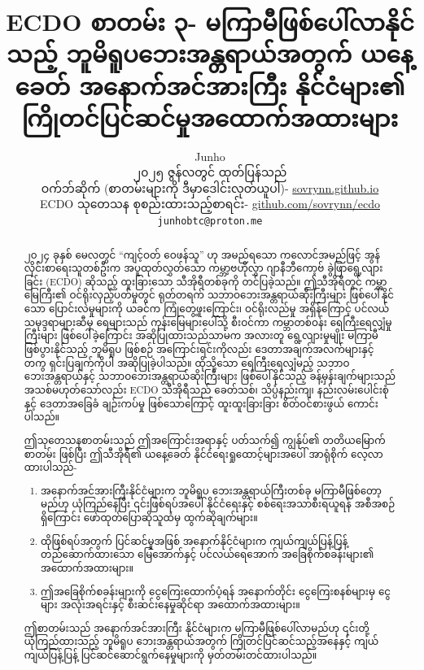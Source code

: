 \documentclass[10pt,twocolumn,letterpaper]{article}
\begin{document}
\title{ECDO စာတမ်း ၃- မကြာမီဖြစ်ပေါ်လာနိုင်သည့် ဘူမိရူပဘေးအန္တရာယ်အတွက် ယနေ့ခေတ် အနောက်အင်အားကြီး နိုင်ငံများ၏ ကြိုတင်ပြင်ဆင်မှုအထောက်အထားများ}

\author{Junho\\
၂၀၂၅ ဇွန်လတွင် ထုတ်ပြန်သည်\\
ဝက်ဘ်ဆိုက် (စာတမ်းများကို ဒီမှာဒေါင်းလုတ်ယူပါ)- \href{https://sovrynn.github.io}{sovrynn.github.io}\\
ECDO သုတေသန စုစည်းထားသည့်စာရင်း- \href{https://github.com/sovrynn/ecdo}{github.com/sovrynn/ecdo}\\
{\tt\small junhobtc@proton.me}
}
\maketitle

\begin{abstract}
၂၀၂၄ ခုနှစ် မေလတွင် “ကျင့်ဝတ် ဝေဖန်သူ” \cite{0} ဟု အမည်ရသော ကလောင်အမည်ဖြင့် အွန်လိုင်းစာရေးသူတစ်ဦးက အပူထုတ်လွှတ်သော ကမ္ဘာ့ဗဟိုလွှာ ဂျာနီဘီကော့ဗ် ခွဲဖြာရွေ့လျားခြင်း (ECDO) \cite{1} ဆိုသည့် ထူးခြားသော သီအိုရီတစ်ခုကို တင်ပြခဲ့သည်။ ဤသီအိုရီတွင် ကမ္ဘာမြေကြီး၏ ဝင်ရိုးလှည့်ပတ်မှုတွင် ရုတ်တရက် သဘာဝဘေးအန္တရာယ်ဆိုးကြီးများ ဖြစ်ပေါ်နိုင်သော ပြောင်းလဲမှုများကို ယခင်က ကြုံတွေ့ဖူးကြောင်း၊ ဝင်ရိုးလည်မှု အရှိန်ကြောင့် ပင်လယ်သမုဒ္ဒရာများဆီမှ ရေများသည် ကုန်းမြေများပေါ်သို့ စီးဝင်ကာ ကမ္ဘာတစ်ဝန်း ရေကြီးရေလျှံမှုကြီးများ ဖြစ်ပေါ်ခဲ့ကြောင်း အဆိုပြုထားသည်သာမက အလားတူ ရွေ့လျားမှုမျိုး မကြာမီဖြစ်ပွားနိုင်သည့် ဘူမိရူပ ဖြစ်စဉ် အကြောင်းရင်းကိုလည်း ဒေတာအချက်အလက်များနှင့်တကွ ရှင်းပြချက်ကိုပါ အဆိုပြုခဲ့ပါသည်။ ထိုသို့သော ရေကြီးရေလျှံမည့် သဘာဝဘေးအန္တရာယ်နှင့် သဘာဝဘေးအန္တရာယ်ဆိုးကြီးများ ဖြစ်ပေါ်နိုင်သည့် ခန့်မှန်းချက်များသည် အသစ်မဟုတ်သော်လည်း ECDO သီအိုရီသည် ခေတ်သစ်၊ သိပ္ပံနည်းကျ၊ နည်းလမ်းပေါင်းစုံနှင့် ဒေတာအခြေခံ ချဉ်းကပ်မှု ဖြစ်သောကြောင့် ထူးထူးခြားခြား စိတ်ဝင်စားဖွယ် ကောင်းပါသည်။

ဤသုတေသနစာတမ်းသည် ဤအကြောင်းအရာနှင့် ပတ်သက်၍ ကျွန်ုပ်၏ တတိယမြောက်စာတမ်း \cite{2,3} ဖြစ်ပြီး ဤသီအိုရီ၏ ယနေ့ခေတ် နိုင်ငံရေးရှုထောင့်များအပေါ် အာရုံစိုက် လေ့လာထားပါသည်-
\begin{flushleft}
\begin{enumerate}
    \item အနောက်အင်အားကြီးနိုင်ငံများက ဘူမိရူပ ဘေးအန္တရာယ်ကြီးတစ်ခု မကြာမီဖြစ်တော့မည်ဟု ယုံကြည်နေပြီး ၎င်းဖြစ်ရပ်အပေါ် နိုင်ငံရေးနှင့် စစ်ရေးအသာစီးရယူရန် အစီအစဉ်ရှိကြောင်း ဖော်ထုတ်ပြောဆိုသူထံမှ ထွက်ဆိုချက်များ။
    \item ထိုဖြစ်ရပ်အတွက် ပြင်ဆင်မှုအဖြစ် အနောက်နိုင်ငံများက ကျယ်ကျယ်ပြန့်ပြန့် တည်ဆောက်ထားသော မြေအောက်နှင့် ပင်လယ်ရေအောက် အခြေစိုက်စခန်းများ၏ အထောက်အထားများ။
    \item ဤအခြေစိုက်စခန်းများကို ငွေကြေးထောက်ပံ့ရန် အနောက်တိုင်း ငွေကြေးစနစ်များမှ ငွေများ အလုံးအရင်းနှင့် စီးဆင်းနေမှုဆိုင်ရာ အထောက်အထားများ။
\end{enumerate}
\end{flushleft}

ဤစာတမ်းသည် အနောက်အင်အားကြီး နိုင်ငံများက မကြာမီဖြစ်ပေါ်လာမည်ဟု ၎င်းတို့ယုံကြည်ထားသည့် ဘူမိရူပ ဘေးအန္တရာယ်အတွက် ကြိုတင်ပြင်ဆင်သည့်အနေနှင့် ကျယ်ကျယ်ပြန့်ပြန့် ပြင်ဆင်ဆောင်ရွက်နေမှုများကို မှတ်တမ်းတင်ထားပါသည်။
\end{abstract}
\end{document}
